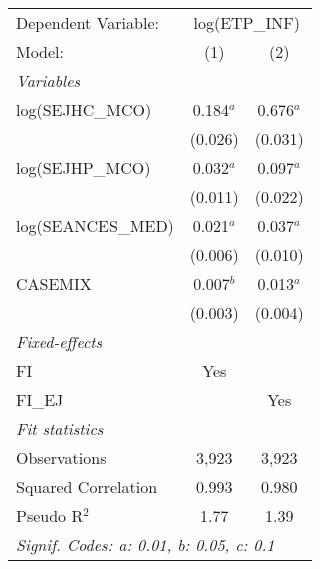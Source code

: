
\begingroup
\centering
\begin{tabular}{lcc}
   \tabularnewline \midrule \midrule
   Dependent Variable: & \multicolumn{2}{c}{log(ETP\_INF)}\\
   Model:              & (1)         & (2)\\  
   \midrule
   \emph{Variables}\\
   log(SEJHC\_MCO)     & 0.184$^{a}$ & 0.676$^{a}$\\   
                       & (0.026)     & (0.031)\\   
   log(SEJHP\_MCO)     & 0.032$^{a}$ & 0.097$^{a}$\\   
                       & (0.011)     & (0.022)\\   
   log(SEANCES\_MED)   & 0.021$^{a}$ & 0.037$^{a}$\\   
                       & (0.006)     & (0.010)\\   
   CASEMIX             & 0.007$^{b}$ & 0.013$^{a}$\\   
                       & (0.003)     & (0.004)\\   
   \midrule
   \emph{Fixed-effects}\\
   FI                  & Yes         & \\  
   FI\_EJ              &             & Yes\\  
   \midrule
   \emph{Fit statistics}\\
   Observations        & 3,923       & 3,923\\  
   Squared Correlation & 0.993       & 0.980\\  
   Pseudo R$^2$        & 1.77        & 1.39\\  
   \midrule \midrule
   \multicolumn{3}{l}{\emph{Signif. Codes: a: 0.01, b: 0.05, c: 0.1}}\\
\end{tabular}
\par\endgroup


